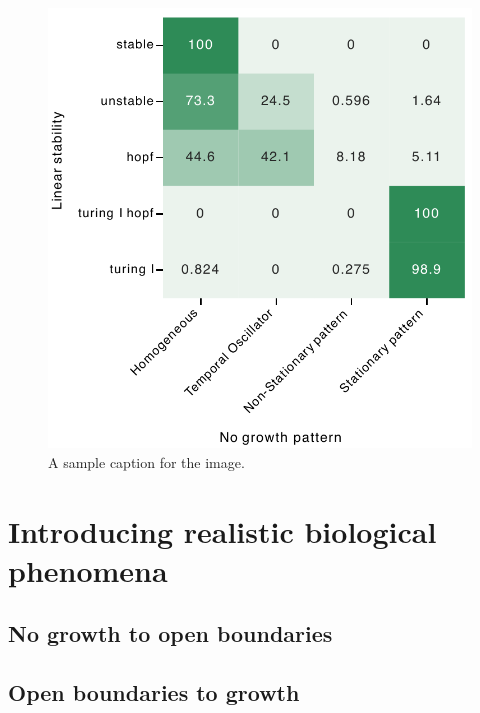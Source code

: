 \begin{figure}[H] %
    \centering
    \includegraphics[width=1\textwidth]{chapters/Chapter 1/lsa_numerical_confusion} %
    \caption{A sample caption for the image.}
    \label{fig:lsa_numerical_confusion} %
\end{figure}



\section{Introducing realistic biological phenomena}
\subsection{No growth to open boundaries}
\subsection{Open boundaries to growth}

